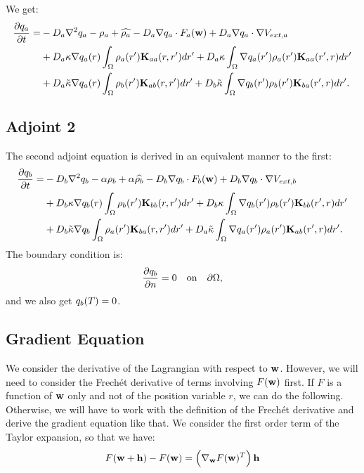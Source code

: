 	We get:
	\begin{align*}
	 \frac{\partial q_a}{\partial t} = &- D_a\nabla^2q_a - \rho_a + \widehat{\rho_a}    - D_a\nabla q_a \cdot F_a(\mathbf{w}) + D_a \nabla q_a \cdot  \nabla V_{ext,a} \\
	 &+ D_a\kappa \nabla q_a(r) \int_\Omega \rho_a (r') \mathbf{K}_{aa}(r,r')dr' + D_a\kappa \int_\Omega \nabla q_a(r') \rho_a (r') \mathbf{K}_{aa}(r',r)dr' \\
	 & + D_a \tilde{\kappa} \nabla q_a(r) \int_\Omega  \rho_b (r') \mathbf{K}_{ab} (r,r')dr' + D_b \tilde \kappa\int_\Omega \nabla q_b(r') \rho_b (r') \mathbf{K}_{ba}(r',r)dr' .
	\end{align*}
	\subsection{Adjoint 2}
	The second adjoint equation is derived in an equivalent manner to the first:
	\begin{align*}
	\frac{\partial q_b}{\partial t} = &- D_b\nabla^2q_b - \alpha \rho_b + \alpha \widehat{\rho_b}    - D_b\nabla q_b \cdot F_b(\mathbf{w}) + D_b \nabla q_b \cdot  \nabla V_{ext,b} \\
	&+ D_b\kappa \nabla q_b(r) \int_\Omega \rho_b (r') \mathbf{K}_{bb}(r,r')dr' + D_b\kappa \int_\Omega \nabla q_b(r') \rho_b (r') \mathbf{K}_{bb}(r',r)dr' \\
	& + D_b \tilde{\kappa} \nabla q_b \int_\Omega  \rho_a (r') \mathbf{K}_{ba} (r,r')dr' + D_a \tilde \kappa\int_\Omega \nabla q_a(r') \rho_a (r') \mathbf{K}_{ab}(r',r)dr'.
	\end{align*}
	The boundary condition is:
	\begin{align*}
	\frac{\partial q_b}{\partial n} = 0 \quad \text{on} \quad \partial \Omega,
	\end{align*} 
	and we also get $q_b(T) = 0$.
	
	\subsection{Gradient Equation}
	We consider the derivative of the Lagrangian with respect to $\mathbf{w}$. However, we will need to consider the Frech\'et derivative of terms involving $F(\mathbf{w})$ first. If $F$ is a function of $\mathbf{w}$ only and not of the position variable $r$, we can do the following. Otherwise, we will have to work with the definition of the Frech\'et derivative and derive the gradient equation like that.
	We consider the first order term of the Taylor expansion, so that we have:
	\begin{align*}
	F(\mathbf{w} + \mathbf{h}) - F(\mathbf{w}) =  \left(\nabla_{\mathbf{w}} F(\mathbf{w})^T\right) \mathbf{h} 
	\end{align*}

